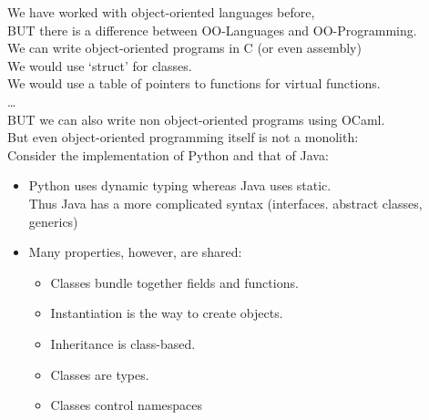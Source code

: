 \documentclass[../../lecture_notes.tex]{subfiles}
\begin{document}
\noindent We have worked with object-oriented languages before, \\
\indent BUT there is a difference between OO-Languages and OO-Programming.\\
We can write object-oriented programs in C (or even assembly)\\
	\indent We would use ‘struct’ for classes.\\
	\indent We would use a table of pointers to functions for virtual functions.\\
	\indent …\\
BUT we can also write non object-oriented programs using OCaml.\\

\noindent But even object-oriented programming itself is not a monolith:\\
Consider the implementation of Python and that of Java:
	\begin{itemize} [itemsep=0mm]
		\item Python uses dynamic typing whereas Java uses static.\\
			Thus Java has a more complicated syntax (interfaces. abstract classes, generics)
		\item Many properties, however, are shared:
			\begin{itemize} [itemsep=0mm]
				\item Classes bundle together fields and functions.
				\item Instantiation is the way to create objects.
				\item Inheritance is class-based.
				\item Classes are types.
				\item Classes control namespaces
			\end{itemize}
	\end{itemize}
\end{document}
